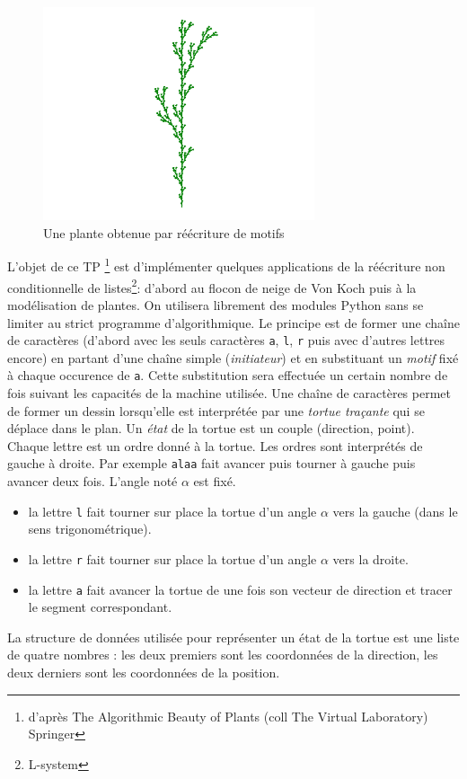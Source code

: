 
\begin{figure}
 \centering
 \includegraphics[width=8cm]{Ereecriture_1_fig.pdf}
 \caption{Une plante obtenue par réécriture de motifs}
 \label{fig:Ereecriture_1}
\end{figure}

L'objet de ce TP \footnote{d'après The Algorithmic Beauty of Plants (coll The Virtual Laboratory) Springer} est d'implémenter quelques applications de la réécriture non conditionnelle de listes\footnote{L-system}: d'abord au flocon de neige de Von Koch puis à la modélisation de plantes.\newline
On utilisera librement des modules Python sans se limiter au strict programme d'algorithmique. \newline
Le principe est de former une chaîne de caractères (d'abord avec les seuls caractères \verb|a|, \verb|l|, \verb|r| puis avec d'autres lettres encore) en partant d'une chaîne simple (\emph{initiateur}) et en substituant un \emph{motif} fixé à chaque occurence de \verb|a|. Cette substitution sera effectuée un certain nombre de fois suivant les capacités de la machine utilisée.\newline
Une chaîne de caractères permet de former un dessin lorsqu'elle est interprétée par une \emph{tortue traçante} qui se déplace dans le plan. Un \emph{état} de la tortue est un couple (direction, point).\newline
Chaque lettre est un ordre donné à la tortue. Les ordres sont interprétés de gauche à droite. Par exemple \verb|alaa| fait avancer puis tourner à gauche puis avancer deux fois. L'angle noté $\alpha$ est fixé.
\begin{itemize}
 \item la lettre \verb|l|  fait tourner sur place la tortue d'un angle $\alpha$ vers la gauche (dans le sens trigonométrique).
\item la lettre \verb|r|  fait tourner sur place la tortue d'un angle $\alpha$ vers la droite.
\item la lettre \verb|a|  fait avancer  la tortue de une fois son vecteur de direction et tracer le segment correspondant.
\end{itemize}
La structure de données utilisée pour représenter un état de la tortue est une liste de quatre nombres : les deux premiers sont les coordonnées de la direction, les deux derniers sont les coordonnées de la position.
